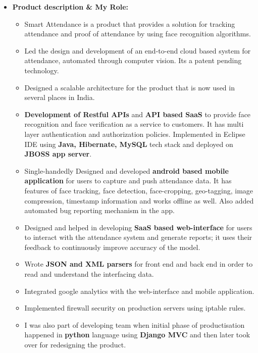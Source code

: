 \documentclass[11pt,letterpaper,sans]{moderncv}        %
\begin{document}
\begin{small}
\begin{itemize}
\begin{itemize}
\item \textbf{Product description \& My Role:}
\begin{itemize}
\item Smart Attendance is a product that provides a solution for tracking attendance and proof of attendance by using face recognition algorithms.
\vspace{2pt}
\item Led the design and development of an end-to-end cloud based system for attendance, automated through computer vision. Its a patent pending technology.
\vspace{2pt}
\item Designed a scalable architecture for the product that is now used in several places in India. 
\vspace{2pt}
\item \textbf{Development of Restful APIs} and \textbf{API based SaaS} to provide face recognition and face verification as a service to customers. It has multi layer authentication and authorization policies. Implemented in Eclipse IDE using \textbf{Java, Hibernate, MySQL} tech stack and deployed on \textbf{JBOSS app server}.
\vspace{2pt}
\item Single-handedly Designed and developed \textbf{android based mobile application} for users to capture and push attendance data. It has features of face tracking, face detection, face-cropping, geo-tagging, image compression, timestamp information and works offline as well. Also added automated bug reporting mechanism in the app.
\vspace{2pt}
\item Designed and helped in developing \textbf{SaaS based web-interface} for users to interact with the attendance system and generate reports; it uses their feedback to continuously improve accuracy of the model.
\vspace{2pt}
\item Wrote \textbf{JSON and XML parsers} for front end and back end in order to read and understand the interfacing data.
\vspace{2pt}
\item Integrated google analytics with the web-interface and mobile application.
\vspace{2pt}
\item Implemented firewall security on production servers using iptable rules.
\vspace{2pt}
\item I was also part of developing team when initial phase of productisation happened in \textbf{python} language using \textbf{Django MVC} and then later took over for redesigning the product.
\end{itemize}
\end{itemize}


\end{itemize}
\end{small}
\end{document}
